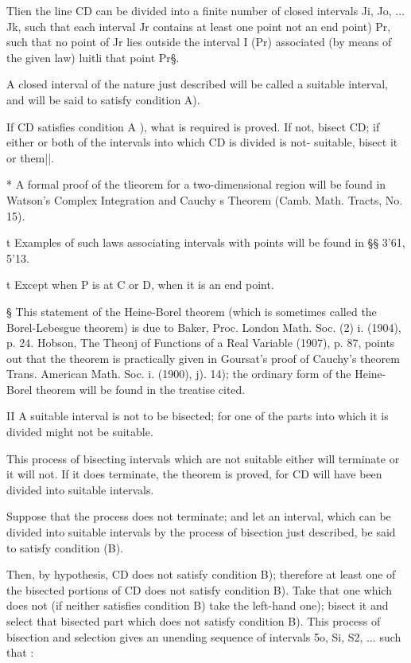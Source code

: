 Tlien the line CD can be divided into a finite number of closed
intervals Ji, Jo, ... Jk, such that each interval Jr contains at least
one point not an end point) Pr, such that no point of Jr lies outside
the interval I (Pr) associated (by means of the given law) luitli that
point Pr§.

A closed interval of the nature just described will be called a
suitable interval, and will be said to satisfy condition A).

If CD satisfies condition A ), what is required is proved. If not,
bisect CD; if either or both of the intervals into which CD is
divided is not- suitable, bisect it or them||.

* A formal proof of the tlieorem for a two-dimensional region will be
found in Watson's Complex Integration and Cauchy s Theorem (Camb.
Math. Tracts, No. 15).

t Examples of such laws associating intervals with points will be
found in §§ 3'61, 5'13.

t Except when P is at C or D, when it is an end point.

§ This statement of the Heine-Borel theorem (which is sometimes called
the Borel-Lebesgue theorem) is due to Baker, Proc. London Math. Soc.
(2) i. (1904), p. 24. Hobson, The Theonj of Functions of a Real
Variable (1907), p. 87, points out that the theorem is practically
given in Goursat's proof of Cauchy's theorem Trans. American Math.
Soc. i. (1900), j). 14); the ordinary form of the Heine-Borel theorem
will be found in the treatise cited.

II A suitable interval is not to be bisected; for one of the parts
into which it is divided might not be suitable.

%
%

This process of bisecting intervals which are not suitable either will
terminate or it will not. If it does terminate, the theorem is proved,
for CD will have been divided into suitable intervals.

Suppose that the process does not terminate; and let an interval,
which can be divided into suitable intervals by the process of
bisection just described, be said to satisfy condition (B).

Then, by hypothesis, CD does not satisfy condition B); therefore at
least one of the bisected portions of CD does not satisfy condition
B). Take that one which does not (if neither satisfies condition B)
take the left-hand one); bisect it and select that bisected part
which does not satisfy condition B). This process of bisection and
selection gives an unending sequence of intervals 5o, Si, S2, ... such
that :

